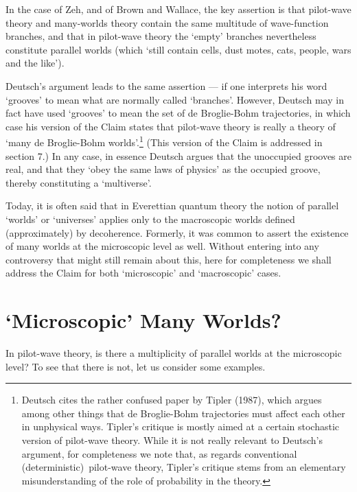 \documentclass{article}%
\begin{document}
In the case of Zeh, and of Brown and Wallace, the key assertion is that
pilot-wave theory and many-worlds theory contain the same multitude of
wave-function branches, and that in pilot-wave theory the `empty' branches
nevertheless constitute parallel worlds (which `still contain cells, dust
motes, cats, people, wars and the like').

Deutsch's argument leads to the same assertion --- if one interprets his word
`grooves' to mean what are normally called `branches'. However, Deutsch may in
fact have used `grooves' to mean the set of de Broglie-Bohm trajectories, in
which case his version of the Claim states that pilot-wave theory is really a
theory of `many de Broglie-Bohm worlds'.\footnote{Deutsch cites the rather
confused paper by Tipler (1987), which argues among other things that de
Broglie-Bohm trajectories must affect each other in unphysical ways. Tipler's
critique is mostly aimed at a certain stochastic version of pilot-wave theory.
While it is not really relevant to Deutsch's argument, for completeness we
note that, as regards conventional (deterministic)\ pilot-wave theory,
Tipler's critique stems from an elementary misunderstanding of the role of
probability in the theory.} (This version of the Claim is addressed in section
7.) In any case, in essence Deutsch argues that the unoccupied grooves are
real, and that they `obey the same laws of physics' as the occupied groove,
thereby constituting a `multiverse'.

Today, it is often said that in Everettian quantum theory the notion of
parallel `worlds' or `universes' applies only to the macroscopic worlds
defined (approximately) by decoherence. Formerly, it was common to assert the
existence of many worlds at the microscopic level as well. Without entering
into any controversy that might still remain about this, here for completeness
we shall address the Claim for both `microscopic' and `macroscopic' cases.

\section{`Microscopic' Many Worlds?}

In pilot-wave theory, is there a multiplicity of parallel worlds at the
microscopic level? To see that there is not, let us consider some examples.
\end{document}
